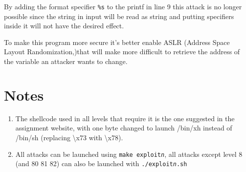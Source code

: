 \documentclass[a4paper,12pt]{article}
\begin{document}
By adding the format specifier \texttt{\%s} to the printf in line 9 this attack is no longer possible since the string in input will be read as string and putting specifiers inside it will not have the desired effect.

To make this program more secure it's better enable ASLR (Address Space Layout Randomization,)that will make more difficult to retrieve the address of the variable an attacker wants to change. 


\section{Notes}
\begin{enumerate}


\item The shellcode used in all levels that require it is the one suggested in the assignment website, with one byte changed to launch /bin/xh instead of /bin/sh (replacing \textbackslash x73 with \textbackslash x78).


\item All attacks can be launched using \texttt{make exploit\textit{n}}, all attacks except level 8 (and 80 81 82) can also be launched with \texttt{./exploit\textit{n}.sh}
\end{enumerate}
\end{document}
